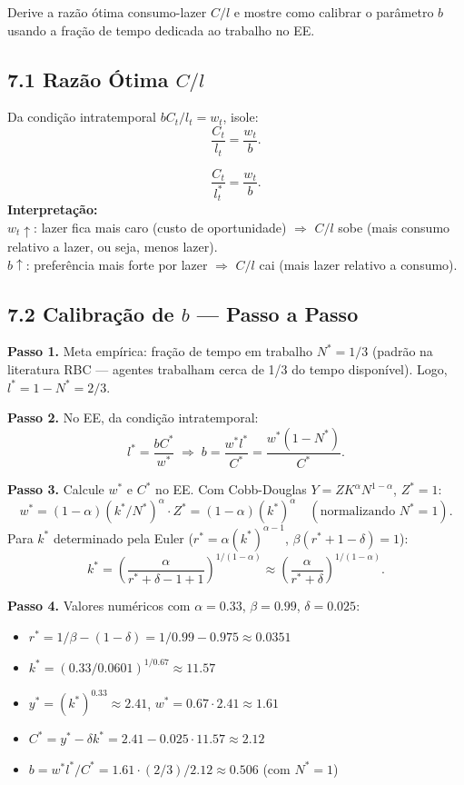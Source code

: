 \documentclass[12pt, a4paper]{article}
\begin{document}
Derive a razão ótima consumo-lazer $C/l$ e mostre como calibrar o parâmetro $b$ usando a fração de tempo dedicada ao trabalho no EE.

\subsection*{7.1 Razão Ótima $C/l$}

Da condição intratemporal $bC_t/l_t = w_t$, isole:
\[
\frac{C_t}{l_t} = \frac{w_t}{b}.
\]

\begin{resultbox}[title={Razão Consumo-Lazer Ótima}]
\[
\frac{C_t}{l_t^*} = \frac{w_t}{b}.
\]
\textbf{Interpretação:}\\
$w_t\uparrow$: lazer fica mais caro (custo de oportunidade) $\Rightarrow$ $C/l$ sobe (mais consumo relativo a lazer, ou seja, menos lazer).\\
$b\uparrow$: preferência mais forte por lazer $\Rightarrow$ $C/l$ cai (mais lazer relativo a consumo).
\end{resultbox}

\subsection*{7.2 Calibração de $b$ --- Passo a Passo}

\textbf{Passo 1.} Meta empírica: fração de tempo em trabalho $N^* = 1/3$ (padrão na literatura RBC --- agentes trabalham cerca de 1/3 do tempo disponível). Logo, $l^* = 1 - N^* = 2/3$.

\textbf{Passo 2.} No EE, da condição intratemporal:
\[
l^* = \frac{bC^*}{w^*} \;\Longrightarrow\; b = \frac{w^* l^*}{C^*} = \frac{w^*(1-N^*)}{C^*}.
\]

\textbf{Passo 3.} Calcule $w^*$ e $C^*$ no EE. Com Cobb-Douglas $Y = ZK^\alpha N^{1-\alpha}$, $Z^*=1$:
\[
w^* = (1-\alpha)(k^*/N^*)^\alpha \cdot Z^* = (1-\alpha)(k^*)^\alpha \quad(\text{normalizando }N^*=1).
\]
Para $k^*$ determinado pela Euler ($r^* = \alpha(k^*)^{\alpha-1}$, $\beta(r^*+1-\delta)=1$):
\[
k^* = \left(\frac{\alpha}{r^*+\delta-1+1}\right)^{1/(1-\alpha)} \approx \left(\frac{\alpha}{r^*+\delta}\right)^{1/(1-\alpha)}.
\]

\textbf{Passo 4.} Valores numéricos com $\alpha=0.33$, $\beta=0.99$, $\delta=0.025$:
\begin{itemize}
\item $r^* = 1/\beta - (1-\delta) = 1/0.99 - 0.975 \approx 0.0351$
\item $k^* = (0.33/0.0601)^{1/0.67} \approx 11.57$
\item $y^* = (k^*)^{0.33} \approx 2.41$, $w^* = 0.67\cdot 2.41 \approx 1.61$
\item $C^* = y^* - \delta k^* = 2.41 - 0.025\cdot 11.57 \approx 2.12$
\item $b = w^* l^*/C^* = 1.61\cdot(2/3)/2.12 \approx 0.506$ (com $N^*=1$)
\end{itemize}
\end{document}
